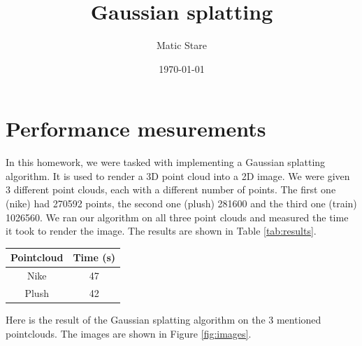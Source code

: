 \documentclass{article}
\title{Gaussian splatting}
\author{Matic Stare}
\date{\today}
\begin{document}
\maketitle

\tableofcontents
\newpage

\section{Performance mesurements}\label{sec:p1}
In this homework, we were tasked with implementing a Gaussian splatting algorithm. It is used to render a 3D point cloud into a 2D image. We were given 3 different point clouds, each with a different number of points. The first one (nike) had 270592 points, the second one (plush) 281600 and the third one (train) 1026560. We ran our algorithm on all three point clouds and measured the time it took to render the image. The results are shown in Table \ref{tab:results}.


\begin{center}
    \begin{tabular}{ |c|c| } 
     \hline
     Pointcloud & Time (s) \\
     \hline
     Nike & 47 \\ 
     Plush & 42 \\
     \hline
    \end{tabular}
\end{center}\label{tab:results}

Here is the result of the Gaussian splatting algorithm on the 3 mentioned pointclouds. The images are shown in Figure \ref{fig:images}.
\end{document}
